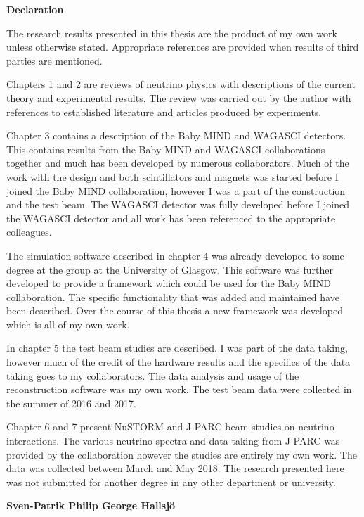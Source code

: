\vspace*{0.75in}
\begin{center} {\bf Declaration}\end{center}


The research results presented in this thesis are the product of my own work unless otherwise stated. Appropriate references are provided when results of third parties are mentioned. 

Chapters 1 and 2 are reviews of neutrino physics with descriptions of the current theory and experimental results. The review was carried out by the author with references to established literature and articles produced by experiments.

Chapter 3 contains a description of the Baby MIND and WAGASCI detectors. This contains results from the Baby MIND and WAGASCI collaborations together and much has been developed by numerous collaborators. Much of the work with the design and both scintillators and magnets was started before I joined the Baby MIND collaboration, however I was a part of the construction and the test beam. The WAGASCI detector was fully developed before I joined the WAGASCI detector and all work has been referenced to the appropriate colleagues.

The simulation software described in chapter 4 was already developed to some degree at the group at the University of Glasgow. This software was further developed to provide a framework which could be used for the Baby MIND collaboration. The specific functionality that was added and maintained have been described. Over the course of this thesis a new framework was developed which is all of my own work.

In chapter 5 the test beam studies are described. I was part of the data taking, however much of the credit of the hardware results and the specifics of the data taking goes to my collaborators. The data analysis and usage of the reconstruction software was my own work. The test beam data were collected in the summer of 2016 and 2017.

Chapter 6 and 7 present NuSTORM and J-PARC beam studies on neutrino interactions. The various neutrino spectra and data taking from J-PARC was provided by the collaboration however the studies are entirely my own work. The data was collected between March and May 2018. The research presented here was not submitted for another degree in any other department or university.


\begin{flushright} \textbf{Sven-Patrik Philip George Hallsj{\"o}}\end{flushright}
